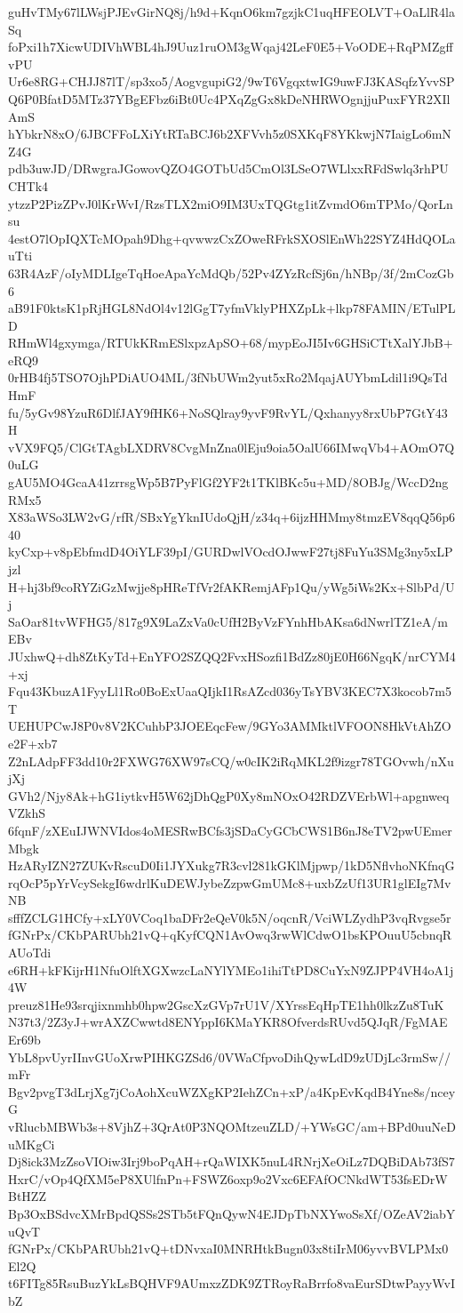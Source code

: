 guHvTMy67lLWsjPJEvGirNQ8j/h9d+KqnO6km7gzjkC1uqHFEOLVT+OaLlR4laSq
foPxi1h7XicwUDIVhWBL4hJ9Uuz1ruOM3gWqaj42LeF0E5+VoODE+RqPMZgffvPU
Ur6e8RG+CHJJ87lT/sp3xo5/AogvgupiG2/9wT6VgqxtwIG9uwFJ3KASqfzYvvSP
Q6P0BfatD5MTz37YBgEFbz6iBt0Uc4PXqZgGx8kDeNHRWOgnjjuPuxFYR2XIlAmS
hYbkrN8xO/6JBCFFoLXiYtRTaBCJ6b2XFVvh5z0SXKqF8YKkwjN7IaigLo6mNZ4G
pdb3uwJD/DRwgraJGowovQZO4GOTbUd5CmOl3LSeO7WLlxxRFdSwlq3rhPUCHTk4
ytzzP2PizZPvJ0lKrWvI/RzsTLX2miO9IM3UxTQGtg1itZvmdO6mTPMo/QorLnsu
4estO7lOpIQXTcMOpah9Dhg+qvwwzCxZOweRFrkSXOSlEnWh22SYZ4HdQOLauTti
63R4AzF/oIyMDLIgeTqHoeApaYcMdQb/52Pv4ZYzRcfSj6n/hNBp/3f/2mCozGb6
aB91F0ktsK1pRjHGL8NdOl4v12lGgT7yfmVklyPHXZpLk+lkp78FAMIN/ETulPLD
RHmWl4gxymga/RTUkKRmESlxpzApSO+68/mypEoJI5Iv6GHSiCTtXalYJbB+eRQ9
0rHB4fj5TSO7OjhPDiAUO4ML/3fNbUWm2yut5xRo2MqajAUYbmLdil1i9QsTdHmF
fu/5yGv98YzuR6DlfJAY9fHK6+NoSQlray9yvF9RvYL/Qxhanyy8rxUbP7GtY43H
vVX9FQ5/ClGtTAgbLXDRV8CvgMnZna0lEju9oia5OalU66IMwqVb4+AOmO7Q0uLG
gAU5MO4GcaA41zrrsgWp5B7PyFlGf2YF2t1TKlBKc5u+MD/8OBJg/WccD2ngRMx5
X83aWSo3LW2vG/rfR/SBxYgYknIUdoQjH/z34q+6ijzHHMmy8tmzEV8qqQ56p640
kyCxp+v8pEbfmdD4OiYLF39pI/GURDwlVOcdOJwwF27tj8FuYu3SMg3ny5xLPjzl
H+hj3bf9coRYZiGzMwjje8pHReTfVr2fAKRemjAFp1Qu/yWg5iWs2Kx+SlbPd/Uj
SaOar81tvWFHG5/817g9X9LaZxVa0cUfH2ByVzFYnhHbAKsa6dNwrlTZ1eA/mEBv
JUxhwQ+dh8ZtKyTd+EnYFO2SZQQ2FvxHSozfi1BdZz80jE0H66NgqK/nrCYM4+xj
Fqu43KbuzA1FyyLl1Ro0BoExUaaQIjkI1RsAZcd036yTsYBV3KEC7X3kocob7m5T
UEHUPCwJ8P0v8V2KCuhbP3JOEEqcFew/9GYo3AMMktlVFOON8HkVtAhZOe2F+xb7
Z2nLAdpFF3dd10r2FXWG76XW97sCQ/w0cIK2iRqMKL2f9izgr78TGOvwh/nXujXj
GVh2/Njy8Ak+hG1iytkvH5W62jDhQgP0Xy8mNOxO42RDZVErbWl+apgnweqVZkhS
6fqnF/zXEuIJWNVIdos4oMESRwBCfs3jSDaCyGCbCWS1B6nJ8eTV2pwUEmerMbgk
HzARyIZN27ZUKvRscuD0Ii1JYXukg7R3cvl281kGKlMjpwp/1kD5NflvhoNKfnqG
rqOcP5pYrVcySekgI6wdrlKuDEWJybeZzpwGmUMc8+uxbZzUf13UR1glEIg7MvNB
sfffZCLG1HCfy+xLY0VCoq1baDFr2eQeV0k5N/oqcnR/VciWLZydhP3vqRvgse5r
fGNrPx/CKbPARUbh21vQ+qKyfCQN1AvOwq3rwWlCdwO1bsKPOuuU5cbnqRAUoTdi
e6RH+kFKijrH1NfuOlftXGXwzcLaNYlYMEo1ihiTtPD8CuYxN9ZJPP4VH4oA1j4W
preuz81He93srqjixnmhb0hpw2GscXzGVp7rU1V/XYrssEqHpTE1hh0lkzZu8TuK
N37t3/2Z3yJ+wrAXZCwwtd8ENYppI6KMaYKR8OfverdsRUvd5QJqR/FgMAEEr69b
YbL8pvUyrIInvGUoXrwPIHKGZSd6/0VWaCfpvoDihQywLdD9zUDjLc3rmSw//mFr
Bgv2pvgT3dLrjXg7jCoAohXcuWZXgKP2IehZCn+xP/a4KpEvKqdB4Yne8s/nceyG
vRlucbMBWb3s+8VjhZ+3QrAt0P3NQOMtzeuZLD/+YWsGC/am+BPd0uuNeDuMKgCi
Dj8ick3MzZsoVIOiw3Irj9boPqAH+rQaWIXK5nuL4RNrjXeOiLz7DQBiDAb73fS7
HxrC/vOp4QfXM5eP8XUlfnPn+FSWZ6oxp9o2Vxc6EFAfOCNkdWT53fsEDrWBtHZZ
Bp3OxBSdvcXMrBpdQSSs2STb5tFQnQywN4EJDpTbNXYwoSsXf/OZeAV2iabYuQvT
fGNrPx/CKbPARUbh21vQ+tDNvxaI0MNRHtkBugn03x8tiIrM06yvvBVLPMx0El2Q
t6FITg85RsuBuzYkLsBQHVF9AUmxzZDK9ZTRoyRaBrrfo8vaEurSDtwPayyWvIbZ
